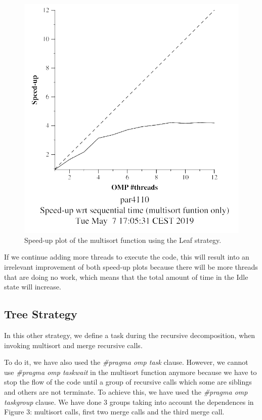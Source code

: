 \documentclass[12pt, a4paper]{article}
\begin{document}
\begin{figure}[H]
\begin{minipage}[b]{0.4\linewidth}
  \includegraphics[scale=0.5]{./S2/S2_strong_scalability/multisort-omp-strong_boada-2_leaf_multisort_only}
  \caption{Speed-up plot of the multisort function using the Leaf strategy.}
  \label{fig:mandel-omp-10000-strong-21-speedup}
\end{minipage}
\end{figure}

If we continue adding more threads to execute the code, this will result into an irrelevant improvement of both speed-up plots because there will be more threads that are doing no work, which means that the total amount of time in the Idle state will increase.

\subsection{Tree Strategy}
\label{treestrategy}

In this other strategy, we define a task during the recursive decomposition, when invoking multisort and merge recursive calls.

To do it, we have also used the \textit{\#pragma omp task} clause. However, we cannot use \textit{\#pragma omp taskwait} in the multisort function anymore because we have to stop the flow of the code until a group of recursive calls which some are siblings and others are not terminate. To achieve this, we have used the \textit{\#pragma omp taskgroup} clause. We have done 3 groups taking into account the dependences in Figure 3: multisort calls, first two merge calls and the third merge call.
\end{document}
